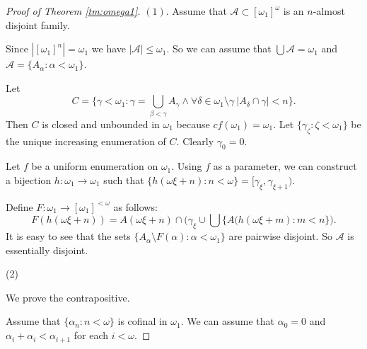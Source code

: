 \documentclass[a4paper,10pt,reqno]{amsart}
\numberwithin{equation}{section}
\theoremstyle{definition}
\theoremstyle{remark}
\newcommand{\mc}[1]{\mathcal{#1}}
\newcommand{\setm}{\setminus}
\newcommand{\subs}{\subset}
\begin{document}
    \begin{proof}[Proof of Theorem \ref{tm:omega1}]
    $(1)$. 
    Assume that $\mc A\subs [{\omega}_1]^{\omega}$ is an $n$-almost disjoint family.
    
    Since $|{[{\omega}_1]}^{n}|={\omega}_1$ we have $|\mc A|\le {\omega}_1$.
    So we can assume that $\bigcup \mc A={\omega}_1$ and 
    $\mc A=\{A_{\alpha}:{\alpha}<{\omega}_1\}$.
    
    
    Let
    \begin{displaymath}
    C=\{{\gamma}<{\omega}_1:{\gamma}=\bigcup_{{\beta}<{\gamma}}A_{\gamma}\land \forall {\delta}\in {\omega}_1\setm {\gamma}
    \ |A_{\delta}\cap {\gamma}|<n\}.
    \end{displaymath}
    Then $C$ is closed and unbounded  in ${\omega}_1$ because 
    $cf({\omega}_1)={\omega}_1$. Let $\{{\gamma}_{\zeta}:{\zeta}<{\omega}_1\}$
    be the unique increasing enumeration of $C$. Clearly ${\gamma}_0=0$.
    
    Let $f$ be a uniform enumeration on ${\omega}_1$.
    Using $f$ as a parameter, we can construct a bijection $h:{\omega}_1\to {\omega}_1$
    such that $\{h({\omega}{\xi}+n):n<{\omega}\}=[{\gamma}_{\xi},{\gamma}_{{\xi}+1})$.
    
    
    
    Define $F:{\omega}_1\to {[{\omega}_1]}^{<{\omega}}$ as follows:
    \begin{displaymath}
    F(h({\omega}{\xi}+n))=A({\omega}{\xi}+n)\cap \big({\gamma}_{\xi}\cup \bigcup 
    \{A(h({\omega}{\xi}+m):m<n\}\big).
    \end{displaymath}
    It is easy to see that the sets $\{A_{{\alpha}}\setm F({\alpha}):{\alpha}<{\omega}_1\}$
    are pairwise disjoint.
        So $\mc A$ is essentially disjoint. 
    
    
    \medskip\noindent (2)
    
    We prove the contrapositive. 
    
    Assume that $\{{\alpha}_n:n<{\omega}\}$ is cofinal in ${\omega}_1$.
    We can assume that ${\alpha}_0=0$ and  ${\alpha}_i+{\alpha}_i<{\alpha}_{i+1}$
    for each $i<{\omega}$. 
    

\end{proof}
\end{document}
